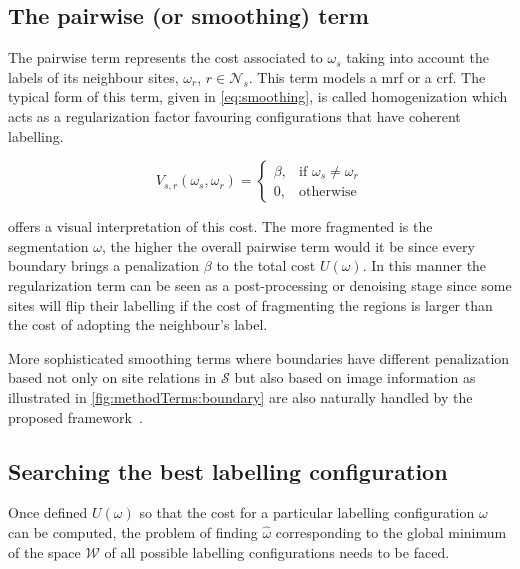 \subsection{The pairwise (or smoothing) term} \label{sec:method:mrfTerm}
 
The pairwise term represents the cost associated to $\omega_s$ taking into account the labels of its neighbour sites, $\omega_r$, $r \in \mathcal{N}_{s}$. 
This term models a \ac{mrf} or a \ac{crf}.
The typical form of this term, given in \cref{eq:smoothing}, is called homogenization which acts as a regularization factor favouring configurations that have coherent labelling.

\begin{equation}
V_{s,r}(\omega_s,\omega_r) = 
\begin{cases}
    \beta, & \text{if } \omega_s \ne \omega_r\\
    0,              & \text{otherwise}
\end{cases}
\label{eq:smoothing}
\end{equation}

 offers a visual interpretation of this cost.
The more fragmented is the segmentation $\omega$, the higher the overall pairwise term would it be since every boundary brings a penalization $\beta$ to the total cost $U(\omega)$.
In this manner the regularization term can be seen as a post-processing or denoising stage since some sites will flip their labelling if the cost of fragmenting the regions is larger than the cost of adopting the neighbour's label. 

More sophisticated smoothing terms where boundaries have different penalization based not only on site relations in $\mathcal{S}$ but also based on image information as illustrated in \cref{fig:methodTerms:boundary} are also naturally handled by the proposed framework~\cite{massich2013phd}.


\subsection{Searching the best labelling configuration} \label{sec:method:min}
Once defined $U(\omega)$ so that the cost for a particular labelling configuration $\omega$ can be computed, the problem of finding $\hat{\omega}$ corresponding to the global minimum of the space $\mathcal{W}$ of all possible labelling configurations needs to be faced. 

